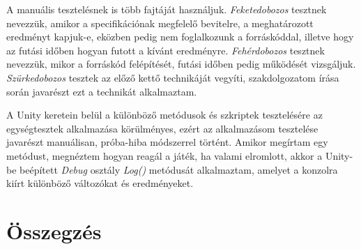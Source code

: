 \documentclass[
]{thesis-ekf}
\theoremstyle{definition}
\theoremstyle{remark}
\begin{document}
A manuális tesztelésnek is több fajtáját használjuk. \emph{Feketedobozos} tesztnek nevezzük, amikor a specifikációnak megfelelő bevitelre, a meghatározott eredményt kapjuk-e, eközben pedig nem foglalkozunk a forráskóddal, illetve hogy az futási időben hogyan futott a kívánt eredményre. \emph{Fehérdobozos} tesztnek nevezzük, mikor a forráskód felépítését, futási időben pedig működését vizsgáljuk. \emph{Szürkedobozos} tesztek az előző kettő technikáját vegyíti, szakdolgozatom írása során javarészt ezt a technikát alkalmaztam. \cite{BlackboxEn,WhiteboxEn,GrayboxEn}

A Unity keretein belül a különböző metódusok és szkriptek tesztelésére az egységtesztek alkalmazása körülményes, ezért az alkalmazásom tesztelése javarészt manuálisan, próba-hiba módszerrel történt. Amikor megírtam egy metódust, megnéztem hogyan reagál a játék, ha valami elromlott, akkor a Unity-be beépített \emph{Debug} osztály \emph{Log()} metódusát alkalmaztam, amelyet a konzolra kiírt különböző változókat és eredményeket. \cite{UnityDocsDebug}


\chapter*{Összegzés}

\end{document}
